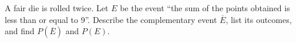 A fair die is rolled twice. Let $E$ be the event ``the sum of the points obtained is less than or equal to $9$''. Describe the complementary event $\overline{E}$, list its outcomes, and find $P(\overline{E})$ and $P(E)$.
